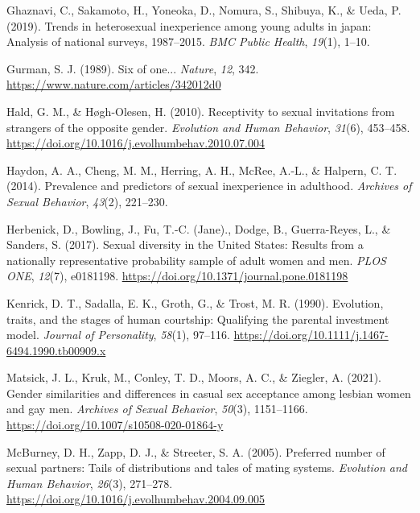 \documentclass[
  11pt,
]{article}
\newlength{\cslhangindent}
\newlength{\cslentryspacingunit} %
\newenvironment{CSLReferences}[2] %
 {%
  \setlength{\parindent}{0pt}
  \ifodd #1
  \let\oldpar\par
  \def\par{\hangindent=\cslhangindent\oldpar}
  \fi
  \setlength{\parskip}{#2\cslentryspacingunit}
 }%
 {}
\begin{document}
\begin{CSLReferences}{1}{0}
\leavevmode{}%
Ghaznavi, C., Sakamoto, H., Yoneoka, D., Nomura, S., Shibuya, K., \&
Ueda, P. (2019). Trends in heterosexual inexperience among young adults
in japan: Analysis of national surveys, 1987--2015. \emph{BMC Public
Health}, \emph{19}(1), 1--10.

\leavevmode{}%
Gurman, S. J. (1989). Six of one... \emph{Nature}, \emph{12}, 342.
\url{https://www.nature.com/articles/342012d0}

\leavevmode{}%
Hald, G. M., \& Høgh-Olesen, H. (2010). Receptivity to sexual
invitations from strangers of the opposite gender. \emph{Evolution and
Human Behavior}, \emph{31}(6), 453--458.
\url{https://doi.org/10.1016/j.evolhumbehav.2010.07.004}

\leavevmode{}%
Haydon, A. A., Cheng, M. M., Herring, A. H., McRee, A.-L., \& Halpern,
C. T. (2014). Prevalence and predictors of sexual inexperience in
adulthood. \emph{Archives of Sexual Behavior}, \emph{43}(2), 221--230.

\leavevmode{}%
Herbenick, D., Bowling, J., Fu, T.-C. (Jane)., Dodge, B., Guerra-Reyes,
L., \& Sanders, S. (2017). Sexual diversity in the {United States}:
Results from a nationally representative probability sample of adult
women and men. \emph{{PLOS} {ONE}}, \emph{12}(7), e0181198.
\url{https://doi.org/10.1371/journal.pone.0181198}

\leavevmode{}%
Kenrick, D. T., Sadalla, E. K., Groth, G., \& Trost, M. R. (1990).
Evolution, traits, and the stages of human courtship: Qualifying the
parental investment model. \emph{Journal of Personality}, \emph{58}(1),
97--116. \url{https://doi.org/10.1111/j.1467-6494.1990.tb00909.x}

\leavevmode{}%
Matsick, J. L., Kruk, M., Conley, T. D., Moors, A. C., \& Ziegler, A.
(2021). Gender similarities and differences in casual sex acceptance
among lesbian women and gay men. \emph{Archives of Sexual Behavior},
\emph{50}(3), 1151--1166.
\url{https://doi.org/10.1007/s10508-020-01864-y}

\leavevmode{}%
McBurney, D. H., Zapp, D. J., \& Streeter, S. A. (2005). Preferred
number of sexual partners: Tails of distributions and tales of mating
systems. \emph{Evolution and Human Behavior}, \emph{26}(3), 271--278.
\url{https://doi.org/10.1016/j.evolhumbehav.2004.09.005}


\end{CSLReferences}
\end{document}
